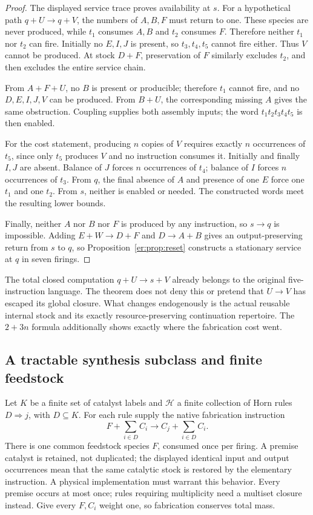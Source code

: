 \documentclass[11pt]{article}
\theoremstyle{definition}
\theoremstyle{remark}
\begin{document}
\begin{proof}
The displayed service trace proves availability at $s$. For a hypothetical path $q+U\to q+V$, the numbers of $A,B,F$ must return to one. These species are never produced, while $t_1$ consumes $A,B$ and $t_2$ consumes $F$. Therefore neither $t_1$ nor $t_2$ can fire. Initially no $E,I,J$ is present, so $t_3,t_4,t_5$ cannot fire either. Thus $V$ cannot be produced. At stock $D+F$, preservation of $F$ similarly excludes $t_2$, and then excludes the entire service chain.

From $A+F+U$, no $B$ is present or producible; therefore $t_1$ cannot fire, and no $D,E,I,J,V$ can be produced. From $B+U$, the corresponding missing $A$ gives the same obstruction. Coupling supplies both assembly inputs; the word $t_1t_2t_3t_4t_5$ is then enabled.

For the cost statement, producing $n$ copies of $V$ requires exactly $n$ occurrences of $t_5$, since only $t_5$ produces $V$ and no instruction consumes it. Initially and finally $I,J$ are absent. Balance of $J$ forces $n$ occurrences of $t_4$; balance of $I$ forces $n$ occurrences of $t_3$. From $q$, the final absence of $A$ and presence of one $E$ force one $t_1$ and one $t_2$. From $s$, neither is enabled or needed. The constructed words meet the resulting lower bounds.

Finally, neither $A$ nor $B$ nor $F$ is produced by any instruction, so $s\to q$ is impossible. Adding $E+W\to D+F$ and $D\to A+B$ gives an output-preserving return from $s$ to $q$, so Proposition~\ref{er:prop:reset} constructs a stationary service at $q$ in seven firings.
\end{proof}

The total closed computation $q+U\to s+V$ already belongs to the original five-instruction language. The theorem does not deny this or pretend that $U\to V$ has escaped its global closure. What changes endogenously is the actual reusable internal stock and its exactly resource-preserving continuation repertoire. The $2+3n$ formula additionally shows exactly where the fabrication cost went.

\subsection{A tractable synthesis subclass and finite feedstock}
Let $K$ be a finite set of catalyst labels and $\mathcal H$ a finite collection of Horn rules $D\Rightarrow j$, with $D\subseteq K$. For each rule supply the native fabrication instruction
\begin{equation}\label{er:eq:horn}
 F+\sum_{i\in D}C_i\longrightarrow C_j+\sum_{i\in D}C_i.
\end{equation}
There is one common feedstock species $F$, consumed once per firing. A premise catalyst is retained, not duplicated; the displayed identical input and output occurrences mean that the same catalytic stock is restored by the elementary instruction. A physical implementation must warrant this behavior. Every premise occurs at most once; rules requiring multiplicity need a multiset closure instead. Give every $F,C_i$ weight one, so fabrication conserves total mass.
\end{document}
